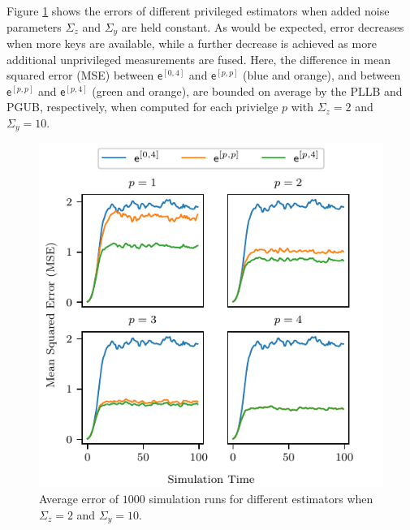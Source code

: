\documentclass[letterpaper, 10 pt, conference]{ieeeconf}
\begin{document}
Figure \ref{fig:mse_privs} shows the errors of different privileged estimators when added noise parameters $\Sigma_z$ and $\Sigma_y$ are held constant. As would be expected, error decreases when more keys are available, while a further decrease is achieved as more additional unprivileged measurements are fused. Here, the difference in mean squared error (MSE) between $\mathsf{e}^{[0,4]}$ and $\mathsf{e}^{[p,p]}$ (blue and orange), and between $\mathsf{e}^{[p,p]}$ and $\mathsf{e}^{[p,4]}$ (green and orange), are bounded on average by the PLLB and PGUB, respectively, when computed for each privielge $p$ with $\Sigma_z=2$ and $\Sigma_y=10$.
\begin{figure}[htbp]
  \centering
  \includegraphics{figures/mse_privs.pdf}
  \caption{Average error of $1000$ simulation runs for different estimators when $\Sigma_z=2$ and $\Sigma_y=10$.}
  \label{fig:mse_privs}
\end{figure}
\end{document}
